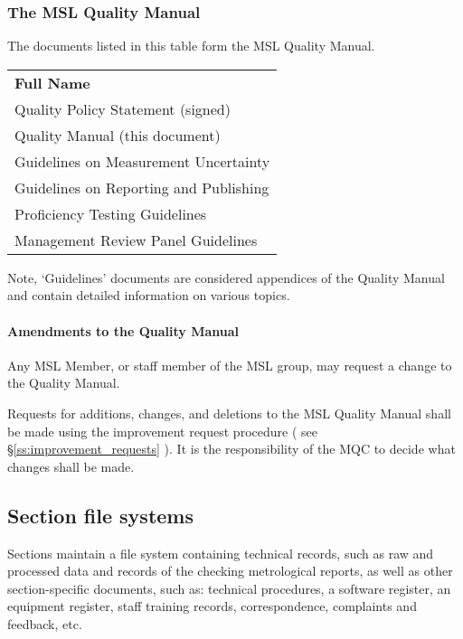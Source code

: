 \subsubsection{The MSL Quality Manual}
The documents listed in this table form the MSL Quality Manual. 
{\renewcommand*{\arraystretch}{1.4}
\begin{longtable}{p{25em}}
	\rowcolor[rgb]{ 0,  0,  0} 
	\textcolor[rgb]{ 1,  1,  1}{\textbf{Full Name}} \\
	
Quality Policy Statement (signed) \\

Quality Manual (this document) \\

Guidelines on Measurement Uncertainty \\

Guidelines on Reporting and Publishing \\

Proficiency Testing Guidelines \\

Management Review Panel Guidelines \\
\bottomrule
\end{longtable}
}%

Note, `Guidelines' documents are considered appendices of the Quality Manual and contain detailed information on various topics. 

\paragraph{Amendments to the Quality Manual}
Any MSL Member, or staff member of the MSL group, may request a change to the Quality Manual. 

Requests for additions, changes, and deletions to the MSL Quality Manual shall be made using the improvement request procedure ( see \S\ref{ss:improvement_requests} ).
It is the responsibility of the MQC to decide what changes shall be made.

\subsection{Section file systems}
\label{ss:section_file_systems}
Sections maintain a file system containing technical records, such as raw and processed data and records of the checking metrological reports, as well as other section-specific documents, such as: technical procedures, a software register, an equipment register, staff training records, correspondence, complaints and feedback, etc. 


